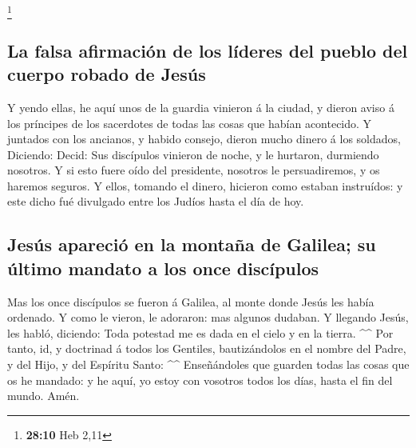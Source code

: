 \footnote{\textbf{28:10} Heb 2,11}

\hypertarget{la-falsa-afirmaciuxf3n-de-los-luxedderes-del-pueblo-del-cuerpo-robado-de-jesuxfas}{%
\subsection{La falsa afirmación de los líderes del pueblo del cuerpo
robado de
Jesús}\label{la-falsa-afirmaciuxf3n-de-los-luxedderes-del-pueblo-del-cuerpo-robado-de-jesuxfas}}

 Y yendo ellas, he aquí unos de la guardia vinieron á la
ciudad, y dieron aviso á los príncipes de los sacerdotes de todas las
cosas que habían acontecido.  Y juntados con los ancianos,
y habido consejo, dieron mucho dinero á los soldados, 
Diciendo: Decid: Sus discípulos vinieron de noche, y le hurtaron,
durmiendo nosotros.  Y si esto fuere oído del presidente,
nosotros le persuadiremos, y os haremos seguros.  Y ellos,
tomando el dinero, hicieron como estaban instruídos: y este dicho fué
divulgado entre los Judíos hasta el día de hoy.

\hypertarget{jesuxfas-apareciuxf3-en-la-montauxf1a-de-galilea-su-uxfaltimo-mandato-a-los-once-discuxedpulos}{%
\subsection{Jesús apareció en la montaña de Galilea; su último mandato a
los once
discípulos}\label{jesuxfas-apareciuxf3-en-la-montauxf1a-de-galilea-su-uxfaltimo-mandato-a-los-once-discuxedpulos}}

 Mas los once discípulos se fueron á Galilea, al monte
donde Jesús les había ordenado.  Y como le vieron, le
adoraron: mas algunos dudaban.  Y llegando Jesús, les
habló, diciendo: Toda potestad me es dada en el cielo y en la tierra.
\^{}\^{}  Por tanto, id, y doctrinad á todos los Gentiles,
bautizándolos en el nombre del Padre, y del Hijo, y del Espíritu Santo:
\^{}\^{}  Enseñándoles que guarden todas las cosas que os
he mandado: y he aquí, yo estoy con vosotros todos los días, hasta el
fin del mundo. Amén.
